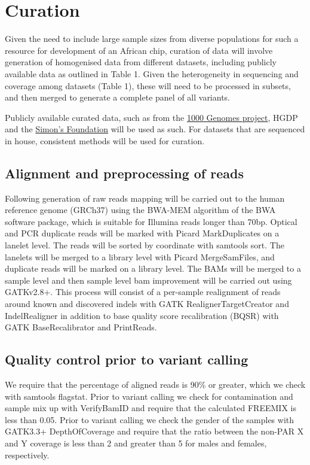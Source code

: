 \section{Curation}
Given the need to include large sample sizes from diverse populations for such a resource for development of an African chip, curation of data will involve generation of homogenised data from different datasets, including publicly available data as outlined in Table 1. Given the heterogeneity in sequencing and coverage among datasets (Table 1), these will need to be processed in subsets, and then merged to generate a complete panel of all variants. 

Publicly available curated data, such as from the \href{http://www.1000genomes.org}{1000 Genomes project}, HGDP and the \href{http://www.simonsfoundation.org/}{Simon’s Foundation} will be used as such. For datasets that are sequenced in house, consistent methods will be used for curation.

\subsection{Alignment and preprocessing of reads}
Following generation of raw reads mapping will be carried out to the human reference genome (GRCh37) using the BWA-MEM algorithm of the BWA software package, which is suitable for Illumina reads longer than 70bp.\cite{2013arXiv1303.3997L} Optical and PCR duplicate reads will be marked with Picard MarkDuplicates on a lanelet level. The reads will be sorted by coordinate with samtools sort. The lanelets will be merged to a library level with Picard MergeSamFiles, and duplicate reads will be marked on a library level. The BAMs will be merged to a sample level and then sample level bam improvement will be carried out using GATKv2.8+. This process will consist of a per-sample realignment of reads around known and discovered indels with GATK RealignerTargetCreator and IndelRealigner in addition to base quality score recalibration (BQSR) with GATK BaseRecalibrator and PrintReads.

\subsection{Quality control prior to variant calling}
We require that the percentage of aligned reads is 90\% or greater, which we check with samtools flagstat. Prior to variant calling we check for contamination and sample mix up with VerifyBamID and require that the calculated FREEMIX is less than 0.05. Prior to variant calling we check the gender of the samples with GATK3.3+ DepthOfCoverage and require that the ratio between the non-PAR X and Y coverage is less than 2 and greater than 5 for males and females, respectively.

